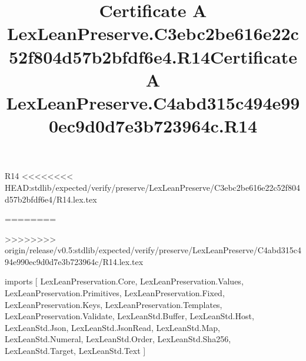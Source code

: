 \begin{lexlean}{R14}
<<<<<<<< HEAD:stdlib/expected/verify/preserve/LexLeanPreserve/C3ebc2be616e22c52f804d57b2bfdf6e4/R14.lex.tex
\title{Certificate A LexLeanPreserve.C3ebc2be616e22c52f804d57b2bfdf6e4.R14}
========
\title{Certificate A LexLeanPreserve.C4abd315c494e990ec9d0d7e3b723964c.R14}
>>>>>>>> origin/release/v0.5:stdlib/expected/verify/preserve/LexLeanPreserve/C4abd315c494e990ec9d0d7e3b723964c/R14.lex.tex
\begin{coremodule}
imports [
  LexLeanPreservation.Core,
  LexLeanPreservation.Values,
  LexLeanPreservation.Primitives,
  LexLeanPreservation.Fixed,
  LexLeanPreservation.Keys,
  LexLeanPreservation.Templates,
  LexLeanPreservation.Validate,
  LexLeanStd.Buffer,
  LexLeanStd.Host,
  LexLeanStd.Json,
  LexLeanStd.JsonRead,
  LexLeanStd.Map,
  LexLeanStd.Numeral,
  LexLeanStd.Order,
  LexLeanStd.Sha256,
  LexLeanStd.Target,
  LexLeanStd.Text
]


\end{coremodule}
\end{lexlean}
